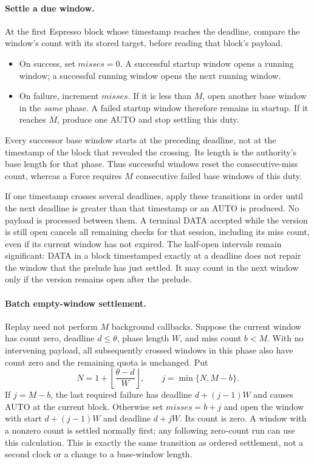 \paragraph{Settle a due window.}
At the first Espresso block whose timestamp reaches the deadline,
compare the window's count with its stored target, before reading that
block's payload.
\begin{itemize}
\item On success, set $\mathit{misses}=0$. A successful startup window
opens a running window; a successful running window opens the next
running window.
\item On failure, increment $\mathit{misses}$. If it is less than $M$,
open another base window in the \emph{same} phase. A failed startup
window therefore remains in startup. If it reaches $M$, produce one
AUTO and stop settling this duty.
\end{itemize}
Every successor base window starts at the preceding deadline, not at
the timestamp of the block that revealed the crossing. Its length is
the authority's base length for that phase. Thus successful windows
reset the consecutive-miss count, whereas a Force requires $M$
consecutive failed base windows of this duty.

If one timestamp crosses several deadlines, apply these transitions in
order until the next deadline is greater than that timestamp or an
AUTO is produced. No payload is processed between them. A terminal
DATA accepted while the version is still open cancels all remaining
checks for that session, including its miss count, even if its current
window has not expired. The half-open intervals remain significant:
DATA in a block timestamped exactly at a deadline does not repair the
window that the prelude has just settled. It may count in the next
window only if the version remains open after the prelude.

\paragraph{Batch empty-window settlement.}
Replay need not perform $M$ background callbacks. Suppose the current
window has count zero, deadline $d\le\theta$, phase length $W$, and
miss count $b<M$. With no intervening payload, all subsequently crossed
windows in this phase also have count zero and the remaining quota is
unchanged. Put
\[
 N=1+\left\lfloor\frac{\theta-d}{W}\right\rfloor,
 \qquad j=\min\{N,M-b\}.
\]
If $j=M-b$, the last required failure has deadline
$d+(j-1)W$ and causes AUTO at the current block. Otherwise set
$\mathit{misses}=b+j$ and open the window with start $d+(j-1)W$ and
deadline $d+jW$. Its count is zero. A window with a nonzero count is
settled normally first; any following zero-count run can use this
calculation. This is exactly the same transition as ordered settlement,
not a second clock or a change to a base-window length.


